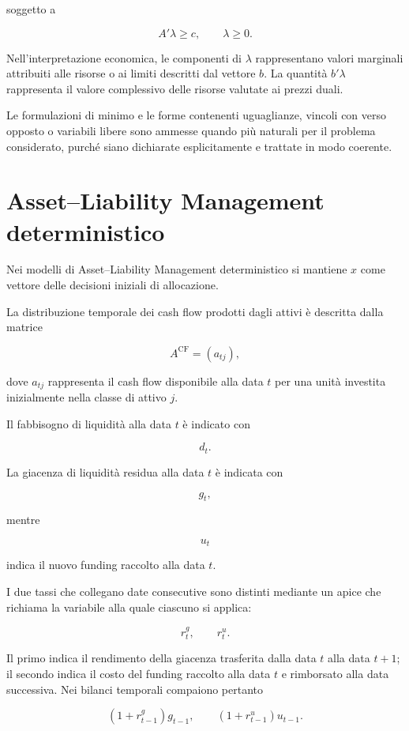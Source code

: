 \documentclass[12pt,a4paper]{article}
\newcommand{\1}{\mathbf{1}}
\begin{document}
soggetto a

\[
A'\lambda\geq c,
\qquad
\lambda\geq0.
\]

Nell'interpretazione economica, le componenti di $\lambda$ rappresentano
valori marginali attribuiti alle risorse o ai limiti descritti dal vettore
$b$. La quantit\`a $b'\lambda$ rappresenta il valore complessivo delle
risorse valutate ai prezzi duali.

Le formulazioni di minimo e le forme contenenti uguaglianze, vincoli con
verso opposto o variabili libere sono ammesse quando pi\`u naturali per il
problema considerato, purch\'e siano dichiarate esplicitamente e trattate
in modo coerente.

\section{Asset--Liability Management deterministico}

Nei modelli di Asset--Liability Management deterministico si mantiene $x$
come vettore delle decisioni iniziali di allocazione.

La distribuzione temporale dei cash flow prodotti dagli attivi \`e descritta
dalla matrice

\[
A^{\mathrm{CF}}
=
(a_{tj}),
\]

dove $a_{tj}$ rappresenta il cash flow disponibile alla data $t$ per una
unit\`a investita inizialmente nella classe di attivo $j$.

Il fabbisogno di liquidit\`a alla data $t$ \`e indicato con

\[
d_t.
\]

La giacenza di liquidit\`a residua alla data $t$ \`e indicata con

\[
g_t,
\]

mentre

\[
u_t
\]

indica il nuovo funding raccolto alla data $t$.

I due tassi che collegano date consecutive sono distinti mediante un apice
che richiama la variabile alla quale ciascuno si applica:

\[
r_t^{g},
\qquad
r_t^{u}.
\]

Il primo indica il rendimento della giacenza trasferita dalla data $t$ alla
data $t+1$; il secondo indica il costo del funding raccolto alla data $t$ e
rimborsato alla data successiva. Nei bilanci temporali compaiono pertanto

\[
\left(1+r_{t-1}^{g}\right)g_{t-1},
\qquad
\left(1+r_{t-1}^{u}\right)u_{t-1}.
\]
\end{document}
